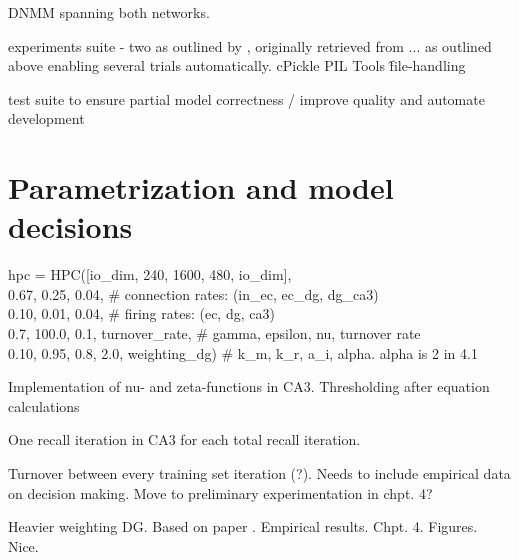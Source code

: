 DNMM spanning both networks.

experiments suite - two as outlined by \citep{Hattori2014}, originally retrieved from ... as outlined above
enabling several trials automatically.
cPickle
PIL
Tools \^
file-handling

test suite to ensure partial model correctness / improve quality and automate development


\section{Parametrization and model decisions}

hpc = HPC([io\_dim, 240, 1600, 480, io\_dim], \\
          0.67, 0.25, 0.04,  \# connection rates: (in\_ec, ec\_dg, dg\_ca3) \\
          0.10, 0.01, 0.04,  \# firing rates: (ec, dg, ca3) \\
          0.7, 100.0, 0.1, turnover\_rate,  \# gamma, epsilon, nu, turnover rate \\
          0.10, 0.95, 0.8, 2.0, weighting\_dg)  \# k\_m, k\_r, a\_i, alpha. alpha is 2 in 4.1
          
Implementation of nu- and zeta-functions in CA3. Thresholding after equation calculations

One recall iteration in CA3 for each total recall iteration.

Turnover between every training set iteration (?). Needs to include empirical data on decision making. Move to preliminary experimentation in chpt. 4?

Heavier weighting DG. Based on paper \citep{Norman2003}. Empirical results. Chpt. 4. Figures. Nice.
